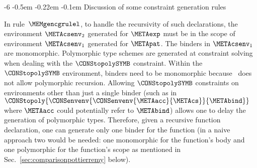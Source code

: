 \documentclass{jfp1}
\makeatletter
\def\subsubsection{\@startsection{subsubsection}{3}{\z@}{-0.2\baselineskip plus -0.1\baselineskip minus -0.1\baselineskip}%
    {-0.5em \@plus -0.22em \@minus -0.1em}{\normalfont\normalsize\bfseries}}%
\newcommand{\sectiontitledot}[1]{#1.}
\renewcommand\subsubsection{\@startsection{subsubsection}{3}{\z@}%
                            {-6\p@ \@plus -1\p@ \@minus -1\p@}%
                            {-0.5em \@plus -0.22em \@minus -0.1em}%
                            {\normalfont\normalsize\bfseries\boldmath\sectiontitledot}}
\makeatother
\begin{document}




\subsubsection{Discussion of some constraint generation rules}

%
In rule~$\MEMgencgrulel$, to handle the recursivity of such
declarations, the environment $\METAcsenv_2$ generated for $\METAexp$
must be in the scope of environment $\METAcsenv_1$ generated for
$\METApat$.
%
The binders in $\METAcsenv_1$ are monomorphic.  Polymorphic type
schemes are generated at constraint solving when dealing with the
$\CONStopolySYMB$ constraint.
%
Within the $\CONStopolySYMB$ environment, binders need to be
monomorphic because \SML\ does not allow polymorphic recursion.
%
Allowing $\CONStopolySYMB$ constraints on environments other than just
a single binder (such as in
$\CONStopoly{\CONSenvenv{\CONSenvenv{\METAacc}{\METAcs}}{\METAbind}}$
where $\METAacc$ could potentially refer to $\METAbind$) allows one to
delay the generation of polymorphic types.  Therefore, given a
recursive function declaration, one can generate only one binder for
the function (in a naive approach two would be needed: one monomorphic
for the function's body and one polymorphic for the function's scope
as mentioned in Sec.~\ref{sec:comparisonpottierremy} below).
%
\end{document}
